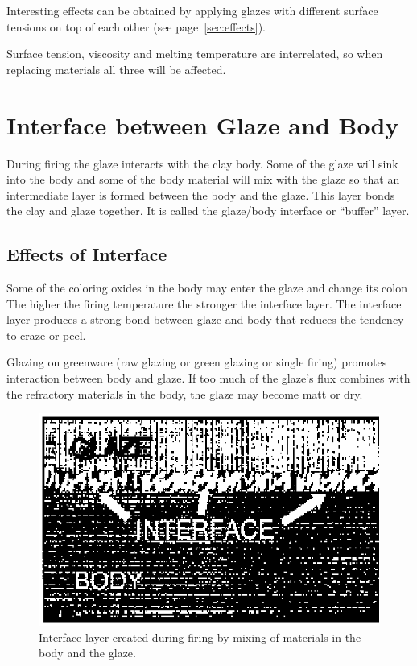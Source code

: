 Interesting effects can be obtained by applying glazes with different surface 
tensions on top of each other (see page~\ref{sec:effects}).

Surface tension, viscosity and melting temperature are interrelated, so when 
replacing materials all three will be affected.
\section{Interface between Glaze and Body}
During firing the glaze interacts with the clay body. Some of the glaze will 
sink into the body and some of the body material will mix with the glaze so 
that an intermediate layer is formed between the body and the glaze. This layer 
bonds the clay and glaze together. It is called the glaze/body interface or 
``buffer'' layer.
\subsection{Effects of Interface}
Some of the coloring oxides in the body may enter the glaze and change its 
colon The higher the firing temperature the stronger the interface layer. The 
interface layer produces a strong bond between glaze and body that reduces the 
tendency to craze or peel.

Glazing on greenware (raw glazing or green glazing or single firing) promotes 
interaction between body and glaze. If too much of the glaze's flux combines 
with the refractory materials in the body, the glaze may become matt or dry.
\begin{figure}[htbp!]
  \centering
  \includegraphics[width=0.8\linewidth]{img/interface.eps}
  \caption{Interface layer created during firing by mixing of materials in the 
  body and the glaze.}
  \label{fig:interface}
\end{figure}
